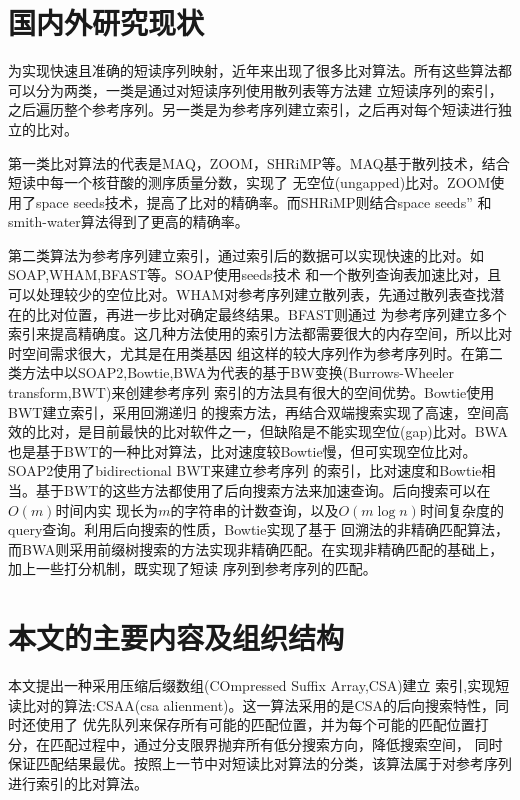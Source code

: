 \section{国内外研究现状}
为实现快速且准确的短读序列映射，近年来出现了很多比对算法。所有这些算法都可以分为两类，一类是通过对短读序列使用散列表等方法建
立短读序列的索引，之后遍历整个参考序列。另一类是为参考序列建立索引，之后再对每个短读进行独立的比对。

第一类比对算法的代表是MAQ，ZOOM，SHRiMP等。MAQ\cite{li2008mapping}基于散列技术，结合短读中每一个核苷酸的测序质量分数，实现了
无空位(ungapped)比对。ZOOM\cite{lin2008zoom}使用了space seeds技术，提高了比对的精确率。而SHRiMP\cite{rumble2009shrimp}则结合space seeds''
和smith-water算法得到了更高的精确率。

第二类算法为参考序列建立索引，通过索引后的数据可以实现快速的比对。如SOAP,WHAM,BFAST等。SOAP\cite{li2008soap}使用seeds技术
和一个散列查询表加速比对，且可以处理较少的空位比对。WHAM\cite{li2012wham}对参考序列建立散列表，先通过散列表查找潜在的比对位置，再进一步比对确定最终结果。BFAST则通过
为参考序列建立多个索引来提高精确度。这几种方法使用的索引方法都需要很大的内存空间，所以比对时空间需求很大，尤其是在用类基因
组这样的较大序列作为参考序列时。在第二类方法中以SOAP2,Bowtie,BWA为代表的基于BW变换(Burrows-Wheeler transform,BWT)\cite{ferragina2005indexing}来创建参考序列
索引的方法具有很大的空间优势。Bowtie\cite{langmead2009ultrafast}使用BWT建立索引，采用回溯递归
的搜索方法，再结合双端搜索实现了高速，空间高效的比对，是目前最快的比对软件之一，但缺陷是不能实现空位(gap)比对。BWA\cite{li2009fast}
也是基于BWT的一种比对算法，比对速度较Bowtie慢，但可实现空位比对。SOAP2\cite{li2009soap2}使用了bidirectional BWT来建立参考序列
的索引，比对速度和Bowtie相当。基于BWT的这些方法都使用了后向搜索方法\cite{lippert2005space}来加速查询。后向搜索可以在$O(m)$时间内实
现长为$m$的字符串的计数查询，以及$O(m\log n)$时间复杂度的query查询。利用后向搜索的性质，Bowtie实现了基于
回溯法的非精确匹配算法，而BWA则采用前缀树搜索的方法实现非精确匹配。在实现非精确匹配的基础上，加上一些打分机制，既实现了短读
序列到参考序列的匹配。

\section{本文的主要内容及组织结构}

本文提出一种采用压缩后缀数组(COmpressed Suffix Array,CSA)建立
索引\cite{grossi2005compressed},实现短读比对的算法:CSAA(csa alienment)。这一算法采用的是CSA的后向搜索特性，同时还使用了
优先队列来保存所有可能的匹配位置，并为每个可能的匹配位置打分，在匹配过程中，通过分支限界抛弃所有低分搜索方向，降低搜索空间，
同时保证匹配结果最优。按照上一节中对短读比对算法的分类，该算法属于对参考序列进行索引的比对算法。

